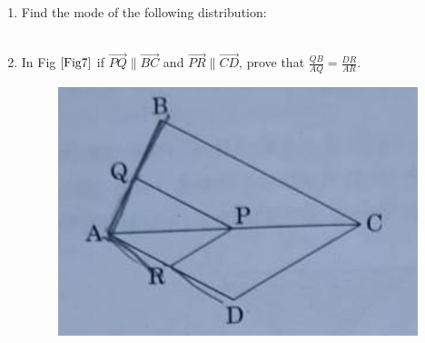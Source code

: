 \documentclass[journal,12pt,twocolumn]{IEEEtran}
\begin{document}
\begin{enumerate}[label=3.\arabic*]
     \item Find the mode of the following distribution:\\
     \vspace{2mm}\\
     \vspace{2mm}
     
    \item In Fig $\ref{Fig7}$ if $\vec{PQ} \parallel \vec{BC}$ and $\vec{PR} \parallel \vec{CD}$, prove that $\frac{QB}{AQ} = \frac{DR}{AR}$.\\
    \begin{figure}[h!]
        \centering
        \includegraphics[width=0.5\columnwidth]{Fig7.png}
    	\caption{}
    	\label{Fig7}
     \end{figure}
    

\end{enumerate}
\end{document}
